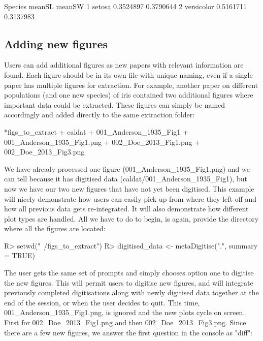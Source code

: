 \documentclass[article]{jss}
\begin{document}
\begin{CodeChunk}
\begin{CodeOutput}
     Species    meanSL    meanSW
1     setosa 0.3524897 0.3790644
2 versicolor 0.5161711 0.3137983
\end{CodeOutput}
\end{CodeChunk}






\subsection{Adding new figures}

Users can add additional figures as new papers with relevant information are found. Each figure should be in its own file with unique naming, even if a single paper has multiple figures for extraction. For example, another paper on different populations (and one new species) of iris contained two additional figures where important data could be extracted. These figures can simply be named accordingly and added directly to the same extraction folder: 

\begin{CodeChunk}
\begin{CodeOutput}
*figs_to_extract
	+ caldat
	  	+ 001_Anderson_1935_Fig1
    + 001_Anderson_1935_Fig1.png
    + 002_Doe_2013_Fig1.png
    + 002_Doe_2013_Fig3.png
\end{CodeOutput}
\end{CodeChunk}

We have already processed one figure (001\_Anderson\_1935\_Fig1.png) and we can tell because it has digitised data (caldat/001\_Anderson\_1935\_Fig1), but now we have our two new figures that have not yet been digitised. This example will nicely demonstrate how users can easily pick up from where they left off and how all previous data gets re-integrated. It will also demonstrate how different plot types are handled. All we have to do to begin, is again, provide the directory where all the figures are located:

\begin{CodeChunk}
\begin{CodeInput}
R> setwd("~/figs_to_extract")
R> digitised_data <- metaDigitise(".", summary = TRUE)
\end{CodeInput}
\end{CodeChunk}

The user gets the same set of prompts and simply chooses option one to digitise the new figures. This will permit users to digitise new figures, and will integrate previously completed digitisations along with newly digitised data together at the end of the session, or when the user decides to quit. This time, 001\_Anderson\_1935\_Fig1.png, is ignored and the new plots cycle on screen. First for 002\_Doe\_2013\_Fig1.png and then 002\_Doe\_2013\_Fig3.png. Since there are a few new figures, we answer the first question in the  console as "diff":
\end{document}
